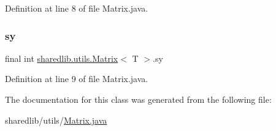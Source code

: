 Definition at line 8 of file Matrix.\+java.

\hypertarget{classsharedlib_1_1utils_1_1_matrix_a184f78d2081c890cd3b09a15b37ea28c}{}\label{classsharedlib_1_1utils_1_1_matrix_a184f78d2081c890cd3b09a15b37ea28c} 
\subsubsection{\texorpdfstring{sy}{sy}}
{\footnotesize\ttfamily final int \hyperlink{classsharedlib_1_1utils_1_1_matrix}{sharedlib.\+utils.\+Matrix}$<$ T $>$.sy}



Definition at line 9 of file Matrix.\+java.



The documentation for this class was generated from the following file\+:\begin{DoxyCompactItemize}
\item 
sharedlib/utils/\hyperlink{_matrix_8java}{Matrix.\+java}\end{DoxyCompactItemize}
